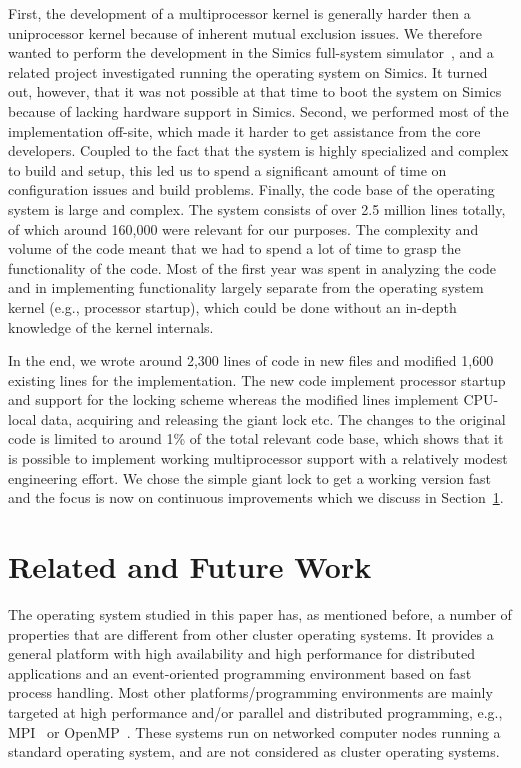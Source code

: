 First, the development of a multiprocessor kernel is generally harder then a
uniprocessor kernel because of inherent mutual exclusion issues. We therefore
wanted to perform the development in the Simics full-system
simulator~\cite{simics}, and a related project investigated running the
operating system on Simics. It turned out, however, that it was not possible
at that time to boot the system on Simics because of lacking hardware support
in Simics. Second, we performed most of the implementation off-site, which
made it harder to get assistance from the core developers. Coupled to the fact
that the system is highly specialized and complex to build and setup, this led
us to spend a significant amount of time on configuration issues and build
problems.  Finally, the code base of the operating system is large and
complex. The system consists of over 2.5 million lines totally, of which
around 160,000 were relevant for our purposes. The complexity and volume of
the code meant that we had to spend a lot of time to grasp the functionality
of the code. Most of the first year was spent in analyzing the code and in
implementing functionality largely separate from the operating system kernel
(e.g., processor startup), which could be done without an in-depth knowledge
of the kernel internals.

In the end, we wrote around 2,300 lines of code in new files and modified
1,600 existing lines for the implementation. The new code implement processor
startup and support for the locking scheme whereas the modified lines
implement CPU-local data, acquiring and releasing the giant lock etc.  The
changes to the original code is limited to around 1\% of the total relevant
code base, which shows that it is possible to implement working multiprocessor
support with a relatively modest engineering effort. We chose the simple giant
lock to get a working version fast and the focus is now on continuous
improvements which we discuss in Section~\ref{sec:related_work}.

\section{Related and Future Work}
\label{sec:related_work}

The operating system studied in this paper has, as mentioned before, a number
of properties that are different from other cluster operating systems.  It
provides a general platform with high availability and high performance for
distributed applications and an event-oriented programming environment based
on fast process handling.  Most other platforms/programming environments are
mainly targeted at high performance and/or parallel and distributed
programming, e.g., MPI~\cite{mpi05standard} or
OpenMP~\cite{openmp05specification}.  These systems run on networked computer
nodes running a standard operating system, and are not considered as cluster
operating systems.

